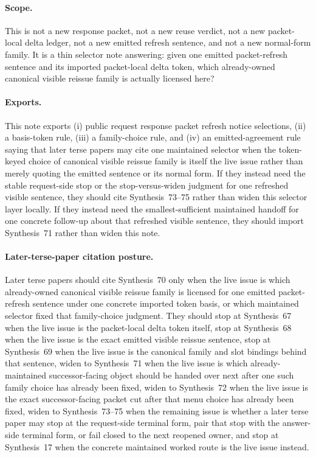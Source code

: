 \documentclass[11pt]{article}
\begin{document}
\paragraph{Scope.}
This is not a new response packet, not a new reuse verdict, not a new packet-local delta ledger, not a new emitted refresh sentence, and not a new normal-form family. It is a thin selector note answering: given one emitted packet-refresh sentence and its imported packet-local delta token, which already-owned canonical visible reissue family is actually licensed here?

\paragraph{Exports.}
This note exports (i) public request response packet refresh notice selections, (ii) a basis-token rule, (iii) a family-choice rule, and (iv) an emitted-agreement rule saying that later terse papers may cite one maintained selector when the token-keyed choice of canonical visible reissue family is itself the live issue rather than merely quoting the emitted sentence or its normal form. If they instead need the stable request-side stop or the stop-versus-widen judgment for one refreshed visible sentence, they should cite Synthesis~73--75 rather than widen this selector layer locally. If they instead need the smallest-sufficient maintained handoff for one concrete follow-up about that refreshed visible sentence, they should import Synthesis~71 rather than widen this note.

\paragraph{Later-terse-paper citation posture.}
Later terse papers should cite Synthesis~70 only when the live issue is which already-owned canonical visible reissue family is licensed for one emitted packet-refresh sentence under one concrete imported token basis, or which maintained selector fixed that family-choice judgment. They should stop at Synthesis~67 when the live issue is the packet-local delta token itself, stop at Synthesis~68 when the live issue is the exact emitted visible reissue sentence, stop at Synthesis~69 when the live issue is the canonical family and slot bindings behind that sentence, widen to Synthesis~71 when the live issue is which already-maintained successor-facing object should be handed over next after one such family choice has already been fixed, widen to Synthesis~72 when the live issue is the exact successor-facing packet cut after that menu choice has already been fixed, widen to Synthesis~73--75 when the remaining issue is whether a later terse paper may stop at the request-side terminal form, pair that stop with the answer-side terminal form, or fail closed to the next reopened owner, and stop at Synthesis~17 when the concrete maintained worked route is the live issue instead.\cite{series:publicrequestresponsepacketrefreshresponsepackets,series:publicrequestresponsepacketrefreshresponsepacketclosureverdicts,series:pairedterminalcitationdiscipline,series:pairedterminalcutoverrule,series:workedexample}
\end{document}
